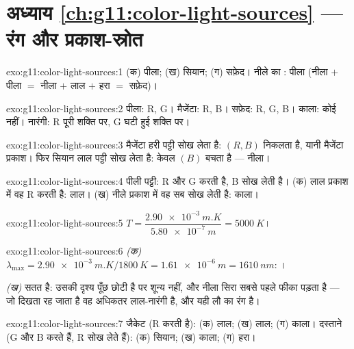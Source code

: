 \section*{अध्याय \ref{ch:g11:color-light-sources} --- रंग और प्रकाश-स्रोत}

\begin{solution}{exo:g11:color-light-sources:1}
(क) पीला; (ख) सियान; (ग) सफ़ेद। नीले का : पीला (नीला $+$ पीला
$=$ नीला $+$ लाल $+$ हरा $=$ सफ़ेद)।
\end{solution}

\begin{solution}{exo:g11:color-light-sources:2}
पीला: R, G। मैजेंटा: R, B। सफ़ेद: R, G, B। काला: कोई नहीं। नारंगी: R पूरी
शक्ति पर, G घटी हुई शक्ति पर।
\end{solution}

\begin{solution}{exo:g11:color-light-sources:3}
मैजेंटा हरी पट्टी सोख लेता है: $(R, B)$ निकलता है, यानी मैजेंटा प्रकाश।
फिर सियान  लाल पट्टी सोख लेता है: केवल $(B)$ बचता है ---
नीला।
\end{solution}

\begin{solution}{exo:g11:color-light-sources:4}
पीली पट्टी: R और G  करती है, B सोख लेती है। (क) लाल प्रकाश
में वह R  करती है: लाल। (ख) नीले प्रकाश में वह सब सोख लेती
है: काला।
\end{solution}

\begin{solution}{exo:g11:color-light-sources:5}
$T = \dfrac{\qty{2.90e-3}{m.K}}{\qty{5.80e-7}{m}} = \qty{5000}{K}$।
\end{solution}

\begin{solution}{exo:g11:color-light-sources:6}
\emph{(क)} $\lambda_{\max} = \qty{2.90e-3}{m.K}/\qty{1800}{K}
= \qty{1.61e-6}{m} = \qty{1610}{nm}$: ।

\emph{(ख)}  सतत है: उसकी दृश्य पूँछ छोटी है पर शून्य
नहीं, और नीला सिरा सबसे पहले फीका पड़ता है --- जो दिखता रह जाता है वह
अधिकतर लाल-नारंगी है, और यही लौ का रंग है।
\end{solution}

\begin{solution}{exo:g11:color-light-sources:7}
जैकेट (R  करती है): (क) लाल; (ख) लाल; (ग) काला। दस्ताने (G
और B  करते हैं, R सोख लेते हैं): (क) सियान; (ख) काला; (ग) हरा।
\end{solution}

